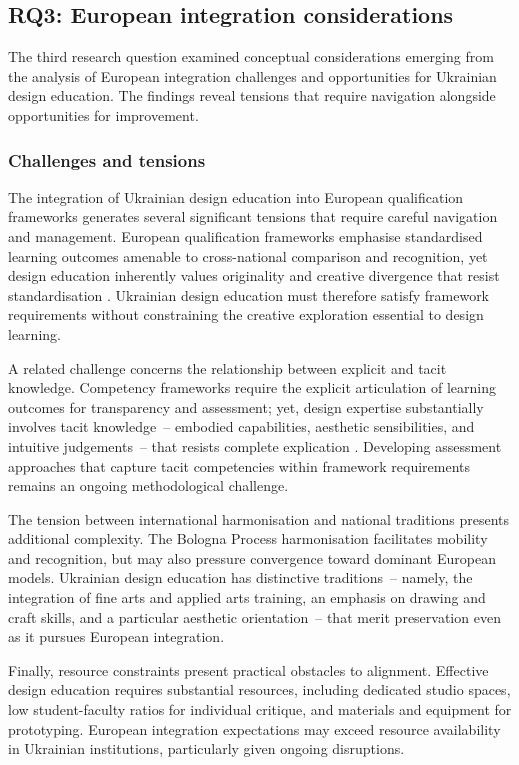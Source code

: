\documentclass[ed]{acnsart}
\begin{document}
	\subsection{RQ3: European integration considerations}
	
	The third research question examined conceptual considerations emerging from the analysis of European integration challenges and opportunities for Ukrainian design education. The findings reveal tensions that require navigation alongside opportunities for improvement.
	
	\subsubsection{Challenges and tensions}
	
	The integration of Ukrainian design education into European qualification frameworks generates several significant tensions that require careful navigation and management. European qualification frameworks emphasise standardised learning outcomes amenable to cross-national comparison and recognition, yet design education inherently values originality and creative divergence that resist standardisation \cite{Weldon2009168}. Ukrainian design education must therefore satisfy framework requirements without constraining the creative exploration essential to design learning.
	
	A related challenge concerns the relationship between explicit and tacit knowledge. Competency frameworks require the explicit articulation of learning outcomes for transparency and assessment; yet, design expertise substantially involves tacit knowledge~-- embodied capabilities, aesthetic sensibilities, and intuitive judgements~-- that resists complete explication \cite{Schon1983}. Developing assessment approaches that capture tacit competencies within framework requirements remains an ongoing methodological challenge.
	
	The tension between international harmonisation and national traditions presents additional complexity. The Bologna Process harmonisation facilitates mobility and recognition, but may also pressure convergence toward dominant European models. Ukrainian design education has distinctive traditions~-- namely, the integration of fine arts and applied arts training, an emphasis on drawing and craft skills, and a particular aesthetic orientation~-- that merit preservation even as it pursues European integration.
	
	Finally, resource constraints present practical obstacles to alignment. Effective design education requires substantial resources, including dedicated studio spaces, low student-faculty ratios for individual critique, and materials and equipment for prototyping. European integration expectations may exceed resource availability in Ukrainian institutions, particularly given ongoing disruptions.
	
\end{document}
